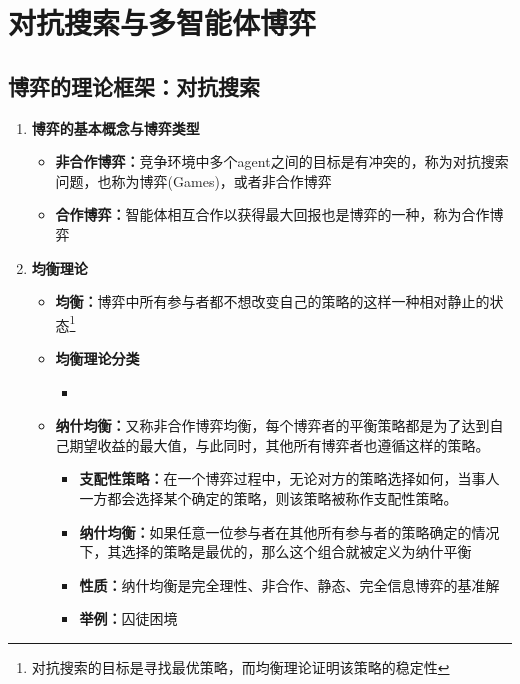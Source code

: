 \documentclass[../main.tex]{subfiles}
\begin{document}
\section{对抗搜索与多智能体博弈}\label{sec:adversarial-search}
\subsection{博弈的理论框架：对抗搜索}\label{sec:game-framework}
\begin{enumerate}
    \item \textbf{博弈的基本概念与博弈类型}
    \begin{itemize}
        \item \textbf{非合作博弈：}竞争环境中多个agent之间的目标是有冲突的，称为对抗搜索问题，也称为博弈(Games)，或者非合作博弈
        \item \textbf{合作博弈：}智能体相互合作以获得最大回报也是博弈的一种，称为合作博弈
    \end{itemize}
    \item \textbf{均衡理论}
    \begin{itemize}
        \item \textbf{均衡：}博弈中所有参与者都不想改变自己的策略的这样一种相对静止的状态\footnote{对抗搜索的目标是寻找最优策略，而均衡理论证明该策略的稳定性}
        \item \textbf{均衡理论分类}
        \begin{itemize}
            \item 
        \end{itemize}
        \item \textbf{纳什均衡：}又称非合作博弈均衡，每个博弈者的平衡策略都是为了达到自己期望收益的最大值，与此同时，其他所有博弈者也遵循这样的策略。
        \begin{itemize}
            \item \textbf{支配性策略：}在一个博弈过程中，无论对方的策略选择如何，当事人一方都会选择某个确定的策略，则该策略被称作支配性策略。
            \item \textbf{纳什均衡：}如果任意一位参与者在其他所有参与者的策略确定的情况下，其选择的策略是最优的，那么这个组合就被定义为纳什平衡
            \item \textbf{性质：}纳什均衡是完全理性、非合作、静态、完全信息博弈的基准解
            \item \textbf{举例：}囚徒困境
        \end{itemize}

        
    \end{itemize}
\end{enumerate}
\end{document}
